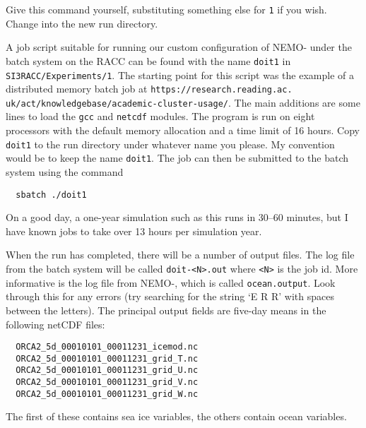 \noindent{}Give this command yourself, substituting something else for \verb|1| if you wish.
Change into the new run directory.

A job script suitable for running our custom configuration of NEMO-\SIcu{} under the batch system on the RACC can be found with the name \verb|doit1| in \verb|SI3RACC/Experiments/1|.
The starting point for this script was the example of a distributed memory batch job at \verb|https://research.reading.ac.| \verb|uk/act/knowledgebase/academic-cluster-usage/|.
The main additions are some lines to load the \verb|gcc| and \verb|netcdf| modules.
The program is run on eight processors with the default memory allocation and a time limit of 16 hours.
Copy \verb|doit1| to the run directory under whatever name you please.
My convention would be to keep the name \verb|doit1|.
The job can then be submitted to the batch system using the command

\begin{verbatim}
  sbatch ./doit1
\end{verbatim}

\noindent{}On a good day, a one-year simulation such as this runs in 30--60 minutes, but I have known jobs to take over 13 hours per simulation year.

When the run has completed, there will be a number of output files.
The log file from the batch system will be called \verb|doit-<N>.out| where \verb|<N>| is the job id.
More informative is the log file from NEMO-\SIcu{}, which is called \verb|ocean.output|.
Look through this for any errors (try searching for the string `E R R' with spaces between the letters).
The principal output fields are five-day means in the following netCDF files:

\begin{verbatim}
  ORCA2_5d_00010101_00011231_icemod.nc
  ORCA2_5d_00010101_00011231_grid_T.nc
  ORCA2_5d_00010101_00011231_grid_U.nc
  ORCA2_5d_00010101_00011231_grid_V.nc
  ORCA2_5d_00010101_00011231_grid_W.nc
\end{verbatim}

\noindent{}The first of these contains sea ice variables, the others contain ocean variables.
